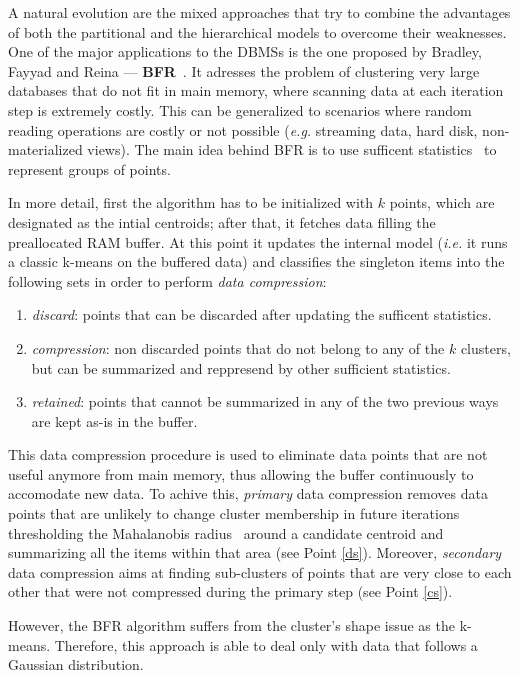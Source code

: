 A natural evolution are the mixed approaches that try to combine the advantages of both the partitional and the hierarchical models to overcome their weaknesses.
One of the major applications to the DBMSs is the one proposed by Bradley, Fayyad and Reina --- \textbf{BFR}~\cite{bradley1998scaling}.
It adresses the problem of clustering very large databases that do not fit in main memory, where scanning data at each iteration step is extremely costly. This can be generalized to scenarios where random reading operations are costly or not possible (\emph{e.g.} streaming data, hard disk, non-materialized views).
The main idea behind BFR is to use sufficent statistics~\cite{fisher1922mathematical} to represent groups of points.

In more detail, first the algorithm has to be initialized with $k$ points, which are designated as the intial centroids;
after that, it fetches data filling the preallocated RAM buffer.
At this point it updates the internal model (\emph{i.e.} it runs a classic k-means on the buffered data) and classifies the 
singleton items into the following sets in order to perform \emph{data compression}:
\begin{enumerate}
	\item \emph{discard}\label{ds}: points that can be discarded after updating the sufficent statistics.
	\item \emph{compression}\label{cs}: non discarded points that do not belong to any of the $k$ clusters,
		but can be summarized and reppresend by other sufficient statistics.
	\item \emph{retained}: points that cannot be summarized in any of the two previous ways are
        kept as-is in the buffer.
\end{enumerate}
This data compression procedure is used to eliminate data points that are not useful anymore from main memory, thus allowing
the buffer continuously to accomodate new data.
To achive this, \emph{primary} data compression removes data points that are unlikely to change cluster membership in future
iterations thresholding the Mahalanobis radius~\cite{duda60} around a candidate centroid and summarizing all the items within that area (see Point \ref{ds}).
Moreover, \emph{secondary} data compression aims at finding sub-clusters of points that are very close to each other that
were not compressed during the primary step (see Point \ref{cs}).

However, the BFR algorithm suffers from the cluster's shape issue as the k-means. Therefore, this approach is able to deal only with
data that follows a Gaussian distribution.